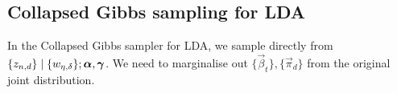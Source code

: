 \subsection{Collapsed Gibbs sampling for LDA}
In the Collapsed Gibbs sampler for LDA, we sample directly from $\{z_{n, d}\} \mid \{w_{\eta, \delta}\}; \boldsymbol{\mathbf{\alpha}}, \boldsymbol{\mathbf{\gamma}}$. We need to marginalise out $\{\vec \beta_t\}, \{\vec \pi_d\}$ from the original joint distribution.





